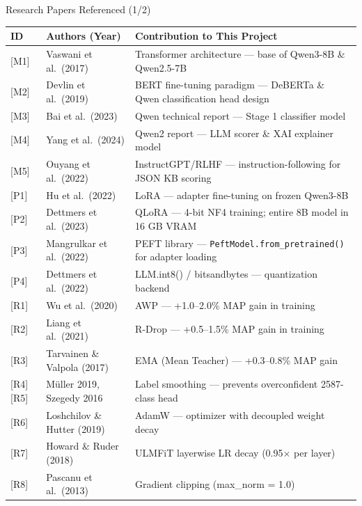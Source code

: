 \documentclass[aspectratio=169]{beamer}
\begin{document}
\begin{frame}{Research Papers Referenced (1/2)}
\scriptsize
\setlength{\tabcolsep}{3pt}
\renewcommand{\arraystretch}{1.2}
\begin{tabular}{p{0.6cm}p{3.2cm}p{7.0cm}}
\toprule
\textbf{ID} & \textbf{Authors (Year)} & \textbf{Contribution to This Project}\\
\midrule
\rowcolor{RowTintA}
{[M1]} & Vaswani et al.\ (2017) & Transformer architecture --- base of Qwen3-8B \& Qwen2.5-7B\\
{[M2]} & Devlin et al.\ (2019) & BERT fine-tuning paradigm --- DeBERTa \& Qwen classification head design\\
\rowcolor{RowTintA}
{[M3]} & Bai et al.\ (2023) & Qwen technical report --- Stage 1 classifier model\\
{[M4]} & Yang et al.\ (2024) & Qwen2 report --- LLM scorer \& XAI explainer model\\
\rowcolor{RowTintA}
{[M5]} & Ouyang et al.\ (2022) & InstructGPT/RLHF --- instruction-following for JSON KB scoring\\
{[P1]} & Hu et al.\ (2022) & LoRA --- adapter fine-tuning on frozen Qwen3-8B\\
\rowcolor{RowTintA}
{[P2]} & Dettmers et al.\ (2023) & QLoRA --- 4-bit NF4 training; entire 8B model in 16 GB VRAM\\
{[P3]} & Mangrulkar et al.\ (2022) & PEFT library --- \texttt{PeftModel.from\_pretrained()} for adapter loading\\
\rowcolor{RowTintA}
{[P4]} & Dettmers et al.\ (2022) & LLM.int8() / bitsandbytes --- quantization backend\\
{[R1]} & Wu et al.\ (2020) & AWP --- +1.0--2.0\% MAP gain in training\\
\rowcolor{RowTintA}
{[R2]} & Liang et al.\ (2021) & R-Drop --- +0.5--1.5\% MAP gain in training\\
{[R3]} & Tarvainen \& Valpola (2017) & EMA (Mean Teacher) --- +0.3--0.8\% MAP gain\\
\rowcolor{RowTintA}
{[R4][R5]} & M\"uller 2019, Szegedy 2016 & Label smoothing --- prevents overconfident 2587-class head\\
{[R6]} & Loshchilov \& Hutter (2019) & AdamW --- optimizer with decoupled weight decay\\
\rowcolor{RowTintA}
{[R7]} & Howard \& Ruder (2018) & ULMFiT layerwise LR decay (0.95$\times$ per layer)\\
{[R8]} & Pascanu et al.\ (2013) & Gradient clipping (max\_norm = 1.0)\\
\bottomrule
\end{tabular}
\end{frame}
\end{document}
